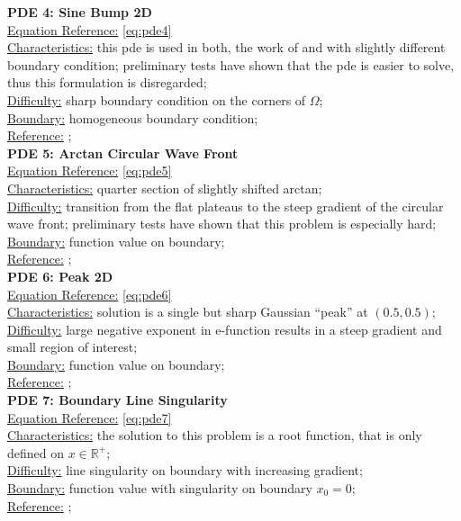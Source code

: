 \documentclass[./\jobname.tex]{subfiles}
\begin{document}
\textbf{PDE 4: Sine Bump 2D} \\
\underline{Equation Reference:} \eqref{eq:pde4} \\
\underline{Characteristics:} this \gls{pde} is used in both, the work of \cite{chaquet_using_2019} and  \cite{mitchell_nist_2018} with slightly different boundary condition; preliminary tests have shown that the \cite{chaquet_using_2019} \gls{pde} is easier to solve, thus this formulation is disregarded;\\
\underline{Difficulty:} sharp boundary condition on the corners of $\Omega$; \\
\underline{Boundary:} homogeneous boundary condition; \\
\underline{Reference:} \cite{mitchell_nist_2018};\\

\textbf{PDE 5: Arctan Circular Wave Front} \\
\underline{Equation Reference:} \eqref{eq:pde5} \\
\underline{Characteristics:} quarter section of slightly shifted arctan; \\
\underline{Difficulty:} transition from the flat plateaus to the steep gradient of the circular wave front; preliminary tests have shown that this problem is especially hard; \\
\underline{Boundary:} function value on boundary; \\
\underline{Reference:} \cite{mitchell_nist_2018}; \\

\textbf{PDE 6: Peak 2D} \\
\underline{Equation Reference:} \eqref{eq:pde6} \\
\underline{Characteristics:} solution is a single but sharp Gaussian ``peak'' at $(0.5, 0.5)$; \\
\underline{Difficulty:} large negative exponent in e-function results in a steep gradient and small region of interest; \\
\underline{Boundary:} function value on boundary; \\
\underline{Reference:} \cite{mitchell_nist_2018}; \\

\textbf{PDE 7: Boundary Line Singularity} \\
\underline{Equation Reference:} \eqref{eq:pde7} \\
\underline{Characteristics:} the solution to this problem is a root function, that is only defined on $x \in \mathbb{R}^{+}$; \\
\underline{Difficulty:} line singularity on boundary with increasing gradient; \\
\underline{Boundary:} function value with singularity on boundary $x_0 = 0$; \\
\underline{Reference:} \cite{mitchell_nist_2018}; \\
\end{document}
